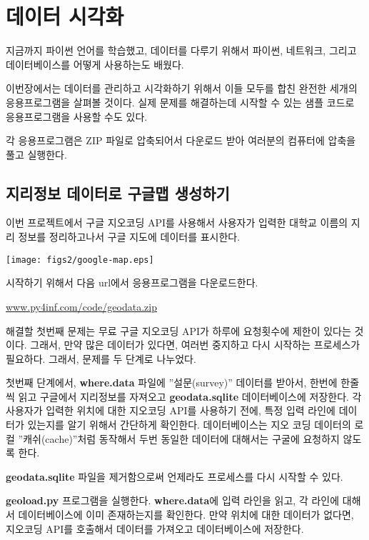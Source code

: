 
\chapter{데이터 시각화}

지금까지 파이썬 언어를 학습했고, 데이터를 다루기 위해서 파이썬, 네트워크, 그리고 데이터베이스를 어떻게 사용하는도 배웠다.

이번장에서는 데이터를 관리하고 시각화하기 위해서 이들 모두를 합친 완전한 세개의 응용프로그램을 살펴볼 것이다.
실제 문제를 해결하는데 시작할 수 있는 샘플 코드로 응용프로그램을 사용할 수도 있다.

각 응용프로그램은 ZIP 파일로 압축되어서 다운로드 받아 여러분의 컴퓨터에 압축을 풀고 실행한다.

\section{지리정보 데이터로 구글맵 생성하기}

이번 프로젝트에서 구글 지오코딩 API를 사용해서 사용자가 입력한 대학교 이름의 지리 정보를 정리하고나서
구글 지도에 데이터를 표시한다.

\beforefig
\centerline{\texttt{[image: figs2/google-map.eps]}}
\afterfig

시작하기 위해서 다음 url에서 응용프로그램을 다운로드한다.

\url{www.py4inf.com/code/geodata.zip}

해결할 첫번째 문제는 무료 구글 지오코딩 API가 하루에 요청횟수에 제한이 있다는 것이다.
그래서, 만약 많은 데이터가 있다면, 여러번 중지하고 다시 시작하는 프로세스가 필요하다.
그래서, 문제를 두 단계로 나누었다.


첫번째 단계에서, {\bf where.data} 파일에 ''설문(survey)'' 데이터를 받아서,
한번에 한줄씩 읽고 구글에서 지리정보를 자져오고 {\bf geodata.sqlite} 데이터베이스에 저장한다.
각 사용자가 입력한 위치에 대한 지오코딩 API를 사용하기 전에, 특정 입력 라인에 데이터가 있는지를 알기 위해서 간단하게 확인한다.
데이터베이스는 지오 코딩 데이터의 로컬 ''캐쉬(cache)''처럼 동작해서 두번 동일한 데이터에 대해서는 구굴에 요청하지 않도록 한다.

{\bf geodata.sqlite} 파일을 제거함으로써 언제라도 프로세스를 다시 시작할 수 있다.

{\bf geoload.py} 프로그램을 실행한다. {\bf where.data}에 입력 라인을 읽고, 각 라인에 대해서
데이터베이스에 이미 존재하는지를 확인한다. 만약 위치에 대한 데이터가 없다면, 지오코딩 API를 호출해서 데이터를 가져오고 데이터베이스에 저장한다.

